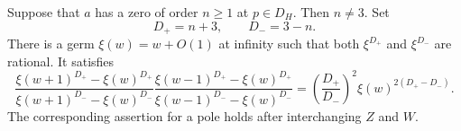 \begin{lemma}
\label{shape:isotropic-profile}
Suppose that \(a\) has a zero of order \(n\geq1\) at \(p\in D_H\).
Then \(n\ne3\). Set
\[
 D_+=n+3,\qquad D_-=3-n.
\]
There is a germ \(\xi(w)=w+O(1)\) at infinity such that both
\(\xi^{D_+}\) and \(\xi^{D_-}\) are rational. It satisfies
\begin{equation}
 \frac{\xi(w+1)^{D_+}-\xi(w)^{D_+}}
      {\xi(w+1)^{D_-}-\xi(w)^{D_-}}
 \frac{\xi(w-1)^{D_+}-\xi(w)^{D_+}}
      {\xi(w-1)^{D_-}-\xi(w)^{D_-}}
 =\left(\frac{D_+}{D_-}\right)^2
      \xi(w)^{2(D_+-D_-)}.
 \label{shape:profile-reflection}
\end{equation}
The corresponding assertion for a pole holds after interchanging
\(Z\) and \(W\).
\end{lemma}

